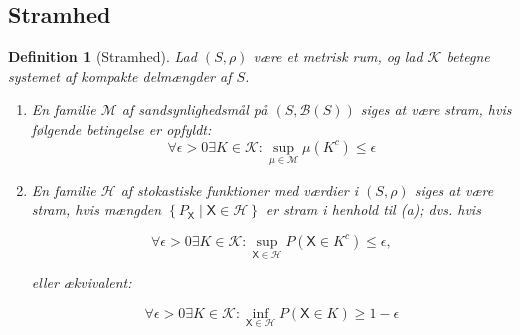 \documentclass{article}
\newcommand{\1}{\mathbbm{1}}
\newcommand{\X}{\mathsf{X}}
\theoremstyle{boxed}
\newtheorem{definition}[theorem]{Definition}
\begin{document}
\subsection{Stramhed}
\begin{theorem-box}
    \begin{definition}[Stramhed]
        Lad $(S, \rho)$ være et metrisk rum, og lad $\mathcal{K}$ betegne systemet af kompakte delmængder af $S$.
\begin{enumerate}
    \item[\textnormal{(a)}] En familie $\mathcal{M}$ af sandsynlighedsmål på $(S, \mathcal{B}(S))$ siges at være stram, hvis følgende betingelse er opfyldt:
$$
\forall \epsilon>0 \exists K \in \mathcal{K}: \sup _{\mu \in \mathcal{M}} \mu\left(K^c\right) \leq \epsilon
$$
\item[\textnormal{(b)}] En familie $\mathcal{H}$ af stokastiske funktioner med værdier i $(S, \rho)$ siges at være stram, hvis mængden $\left\{P_{\X} \mid \X \in \mathcal{H}\right\}$ er stram i henhold til (a); dvs. hvis

$$
\forall \epsilon>0 \exists K \in \mathcal{K}: \sup _{\X \in \mathcal{H}} P\left(\X \in K^c\right) \leq \epsilon,
$$

eller ækvivalent:

$$
\forall \epsilon>0 \exists K \in \mathcal{K}: \inf _{\X \in \mathcal{H}} P(\X \in K) \geq 1-\epsilon
$$
\end{enumerate}


    \end{definition}
\end{theorem-box}
\end{document}
